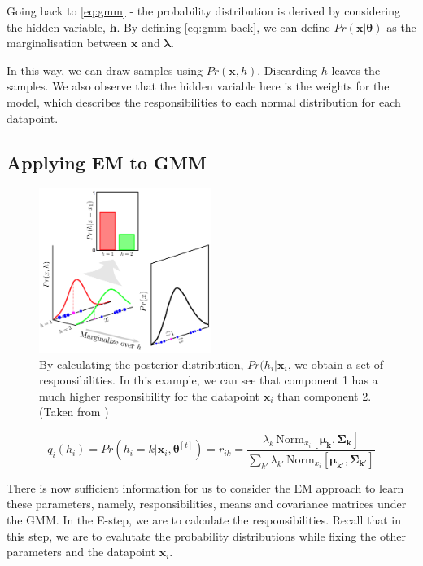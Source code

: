 \documentclass[11pt,openright,a4paper]{article}
\numberwithin{equation}{section}
\begin{document}
Going back to \autoref{eq:gmm} - the probability distribution is derived by considering the hidden variable, $\boldsymbol{h}$. By defining \autoref{eq:gmm-back}, we can define $Pr(\boldsymbol{x} | \boldsymbol{\theta})$ as the marginalisation between $\boldsymbol{x}$ and $\boldsymbol{\lambda}$.

In this way, we can draw samples using $Pr(\boldsymbol{x},h)$. Discarding $h$ leaves the samples. We also observe that the hidden variable here is the weights for the model, which describes the responsibilities to each normal distribution for each datapoint. 

\subsection{Applying EM to GMM} \label{ssec:gmm-em}

\begin{figure}[H]
  \centering
  \includegraphics[width=0.5\textwidth]{gmm-e-step}
    \caption{By calculating the posterior distribution, $Pr(h_i|\boldsymbol{x}_i$, we obtain a set of responsibilities. In this example, we can see that component 1 has a much higher responsibility for the datapoint $\boldsymbol{x}_i$ than component 2. (Taken from \cite{prince})}
  \label{fig:gmm-e-step}
\end{figure} 


\begin{equation}
    \label{eq:gmm-e-step}
    q_i\left(h_i\right) = Pr\left(h_i=k|\boldsymbol{x}_i, \boldsymbol{\theta}^{\left[t\right]}\right) = 
    r_{ik} = 
    \frac{\lambda_{k}\,\mathrm{Norm}_{x_i}\left[\boldsymbol{\mu_k},\boldsymbol{\Sigma_k} \right]}
        {\sum_{k'} \lambda_{k'}\,\mathrm{Norm}_{x_i}\left[\boldsymbol{\mu_{k'}},\boldsymbol{\Sigma_{k'}} \right]}
\end{equation}

There is now sufficient information for us to consider the EM approach to learn these parameters, namely, responsibilities, means and covariance matrices under the GMM. In the E-step, we are to calculate the responsibilities. Recall that in this step, we are to evalutate the probability distributions while fixing the other parameters and the datapoint $\boldsymbol{x}_i$. 
\end{document}
